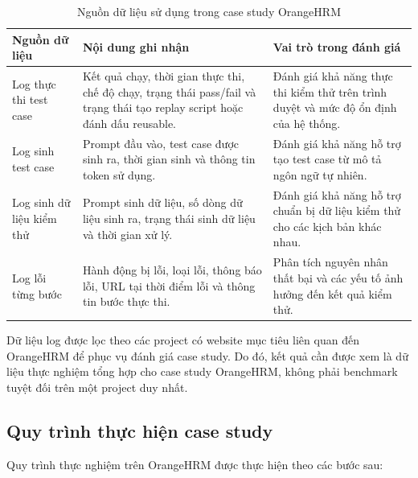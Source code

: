 \begin{table}[H]
\centering
\caption{Nguồn dữ liệu sử dụng trong case study OrangeHRM}
\label{tab:chapter6_case_study_data_sources}
\renewcommand{\arraystretch}{1.2}
\begin{tabular}{|p{4.0cm}|p{5.2cm}|p{5.2cm}|}
\hline
\textbf{Nguồn dữ liệu} & \textbf{Nội dung ghi nhận} & \textbf{Vai trò trong đánh giá} \\
\hline
Log thực thi test case & Kết quả chạy, thời gian thực thi, chế độ chạy, trạng thái pass/fail và trạng thái tạo replay script hoặc đánh dấu reusable. & Đánh giá khả năng thực thi kiểm thử trên trình duyệt và mức độ ổn định của hệ thống. \\
\hline
Log sinh test case & Prompt đầu vào, test case được sinh ra, thời gian sinh và thông tin token sử dụng. & Đánh giá khả năng hỗ trợ tạo test case từ mô tả ngôn ngữ tự nhiên. \\
\hline
Log sinh dữ liệu kiểm thử & Prompt sinh dữ liệu, số dòng dữ liệu sinh ra, trạng thái sinh dữ liệu và thời gian xử lý. & Đánh giá khả năng hỗ trợ chuẩn bị dữ liệu kiểm thử cho các kịch bản khác nhau. \\
\hline
Log lỗi từng bước & Hành động bị lỗi, loại lỗi, thông báo lỗi, URL tại thời điểm lỗi và thông tin bước thực thi. & Phân tích nguyên nhân thất bại và các yếu tố ảnh hưởng đến kết quả kiểm thử. \\
\hline
\end{tabular}
\end{table}

Dữ liệu log được lọc theo các project có website mục tiêu liên quan đến OrangeHRM để phục vụ đánh giá case study. Do đó, kết quả cần được xem là dữ liệu thực nghiệm tổng hợp cho case study OrangeHRM, không phải benchmark tuyệt đối trên một project duy nhất.

\subsection{Quy trình thực hiện case study}

Quy trình thực nghiệm trên OrangeHRM được thực hiện theo các bước sau:

